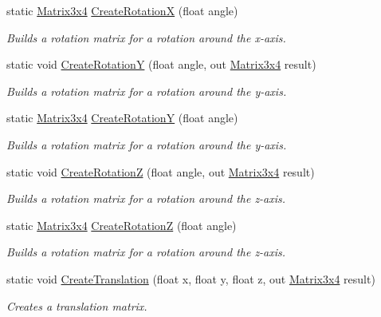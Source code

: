 \begin{DoxyCompactItemize}
static \hyperlink{struct_open_t_k_1_1_matrix3x4}{Matrix3x4} \hyperlink{struct_open_t_k_1_1_matrix3x4_a258342689697f500944b055f2c9af778}{Create\-Rotation\-X} (float angle)
\begin{DoxyCompactList}\small\item\em Builds a rotation matrix for a rotation around the x-\/axis. \end{DoxyCompactList}\item 
static void \hyperlink{struct_open_t_k_1_1_matrix3x4_a96e7742c596ad62b8fb4c07f7830caa5}{Create\-Rotation\-Y} (float angle, out \hyperlink{struct_open_t_k_1_1_matrix3x4}{Matrix3x4} result)
\begin{DoxyCompactList}\small\item\em Builds a rotation matrix for a rotation around the y-\/axis. \end{DoxyCompactList}\item 
static \hyperlink{struct_open_t_k_1_1_matrix3x4}{Matrix3x4} \hyperlink{struct_open_t_k_1_1_matrix3x4_a09673a2c7999e17f5572fd6e93f3b7d2}{Create\-Rotation\-Y} (float angle)
\begin{DoxyCompactList}\small\item\em Builds a rotation matrix for a rotation around the y-\/axis. \end{DoxyCompactList}\item 
static void \hyperlink{struct_open_t_k_1_1_matrix3x4_a26d8a74e4ac6890b849830b250d73e48}{Create\-Rotation\-Z} (float angle, out \hyperlink{struct_open_t_k_1_1_matrix3x4}{Matrix3x4} result)
\begin{DoxyCompactList}\small\item\em Builds a rotation matrix for a rotation around the z-\/axis. \end{DoxyCompactList}\item 
static \hyperlink{struct_open_t_k_1_1_matrix3x4}{Matrix3x4} \hyperlink{struct_open_t_k_1_1_matrix3x4_a763b275f753f6b8831926d4a532a1439}{Create\-Rotation\-Z} (float angle)
\begin{DoxyCompactList}\small\item\em Builds a rotation matrix for a rotation around the z-\/axis. \end{DoxyCompactList}\item 
static void \hyperlink{struct_open_t_k_1_1_matrix3x4_ad40e5f70f4fd81bdaa6995aac0200469}{Create\-Translation} (float x, float y, float z, out \hyperlink{struct_open_t_k_1_1_matrix3x4}{Matrix3x4} result)
\begin{DoxyCompactList}\small\item\em Creates a translation matrix. \end{DoxyCompactList}\item 

\end{DoxyCompactItemize}
